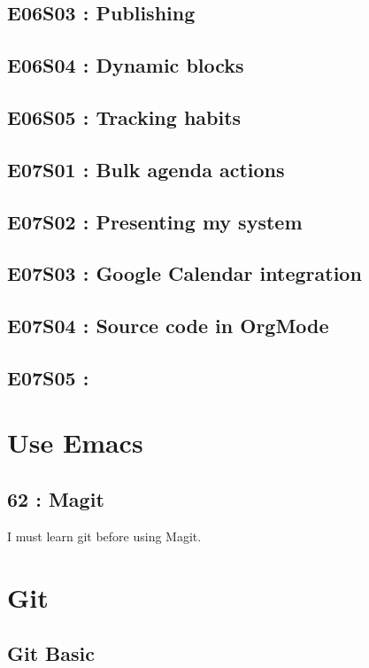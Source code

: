 \documentclass[11pt]{article}
\begin{document}
\subsection{E06S03 : Publishing}
\label{sec:org2723f73}
\subsection{E06S04 : Dynamic blocks}
\label{sec:org28756fb}
\subsection{E06S05 : Tracking habits}
\label{sec:orgcea30dd}
\subsection{E07S01 : Bulk agenda actions}
\label{sec:org317ee33}
\subsection{E07S02 : Presenting my system}
\label{sec:orgf9326d2}
\subsection{E07S03 : Google Calendar integration}
\label{sec:org4845dae}
\subsection{E07S04 : Source code in OrgMode}
\label{sec:org64cf568}
\subsection{E07S05 :}
\label{sec:orgd009b4a}
\section{Use Emacs}
\label{sec:orgdd7d0d1}
\subsection{62 : Magit}
\label{sec:org576176e}
I must learn git before using Magit.

\section{Git}
\label{sec:org19a8bac}
\subsection{Git Basic}
\label{sec:orgad714d5}
\end{document}
